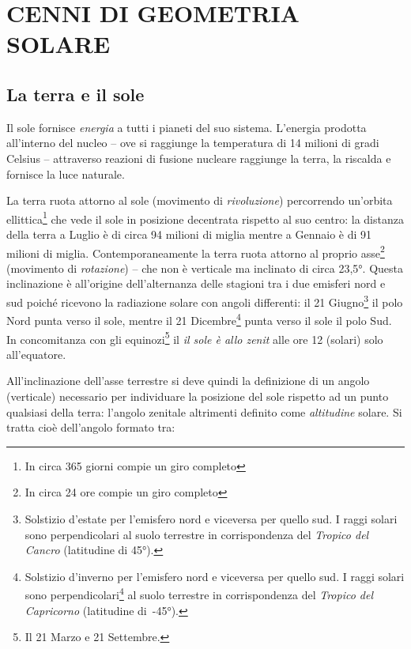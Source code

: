 
\chapter{CENNI DI GEOMETRIA SOLARE}
\label{chp:geometria-solare}

\section{La terra e il sole}
\label{sec:terra-sole}

Il sole fornisce \emph{energia} a tutti i pianeti del suo sistema. L'energia prodotta all'interno del nucleo – ove si raggiunge la temperatura di 14 milioni di gradi Celsius – attraverso reazioni di fusione nucleare raggiunge la terra, la riscalda e fornisce la luce naturale. 

La terra ruota attorno al sole (movimento di \emph{rivoluzione}) percorrendo un'orbita ellittica\footnote{In circa 365 giorni compie un giro completo} che vede il sole in posizione decentrata rispetto al suo centro: la distanza della terra a Luglio è di circa 94 milioni di miglia mentre a Gennaio è di 91 milioni di miglia. Contemporaneamente la terra ruota attorno al proprio asse\footnote{In circa 24 ore compie un giro completo} (movimento di \emph{rotazione}) – che non è verticale ma inclinato di circa \ang{23,5}. Questa inclinazione è all'origine dell'alternanza delle stagioni tra i due emisferi nord e sud poiché ricevono la radiazione solare con angoli differenti: il 21 Giugno\footnote{Solstizio d'estate per l'emisfero nord e viceversa per quello sud. I raggi solari sono perpendicolari al suolo terrestre in corrispondenza del \emph{Tropico del Cancro} (latitudine di \ang{45}).} il polo Nord punta verso il sole, mentre il 21 Dicembre\footnote{Solstizio d'inverno per l'emisfero nord e viceversa per quello sud. I raggi solari sono perpendicolari\footnote{Questa situazione avviene alle ore 12 (solari) e si definisce comunemente con l'espressione: di \emph{sole allo zenit}} al suolo terrestre in corrispondenza del \emph{Tropico del Capricorno} (latitudine di~\ang{-45}).} punta verso il sole il polo Sud. In concomitanza con gli equinozi\footnote{Il 21 Marzo e 21 Settembre.} il \emph{il sole è allo zenit} alle ore 12 (solari) solo all'equatore.

All'inclinazione dell'asse terrestre si deve quindi la definizione di un angolo (verticale) necessario per individuare la posizione del sole rispetto ad un punto qualsiasi della terra: l'angolo zenitale altrimenti definito come \emph{altitudine} solare. Si tratta cioè dell'angolo formato tra:

